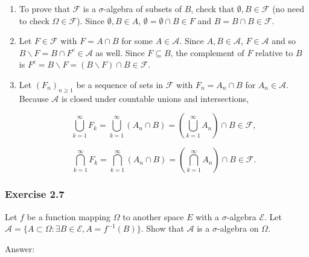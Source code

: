 \documentclass{article}
\begin{document}
\begin{enumerate}
\item To prove that $\mathcal{F}$ is a $\sigma$-algebra of subsets of $B$, check that $\emptyset, B \in \mathcal{F}$ (no need to check $\Omega \in \mathcal{F}$). Since $\emptyset, B \in A$, $\emptyset = \emptyset\cap B \in F$ and $B = B\cap B \in \mathcal{F}$. 

\item Let $F \in \mathcal{F}$ with $F = A\cap B$ for some $A \in \mathcal{A}$. Since $A,B \in \mathcal{A}$, $F \in \mathcal{A}$ and so $B \backslash F = B \cap F^c \in \mathcal{A}$ as well. Since $F \subseteq B$, the complement of $F$ relative to $B$ is $F^c = B \backslash F =  (B\backslash F) \cap B \in \mathcal{F}$.


\item Let $(F_n)_{n\geq 1}$ be a sequence of sets in $\mathcal{F}$ with $F_n = A_n \cap B$ for $A_n \in \mathcal{A}$. Because $\mathcal{A}$ is closed under countable unions and intersections,

$$
\bigcup_{k=1}^\infty F_k = \bigcup_{k=1}^\infty (A_n \cap B) = \left(\bigcup_{k=1}^\infty A_n\right) \cap B \in \mathcal{F},
$$

$$
\bigcap_{k=1}^\infty F_k = \bigcap_{k=1}^\infty (A_n \cap B) = \left(\bigcap_{k=1}^\infty A_n\right) \cap B \in \mathcal{F}.
$$
\end{enumerate}

\subsubsection*{Exercise 2.7}

Let $f$ be a function mapping $\Omega$ to another space $E$ with a $\sigma$-algebra $\mathcal{E}$.
Let $\mathcal{A} = \{A \subset \Omega : \exists B \in \mathcal{E}, A = f^{-1}(B)\}$. Show that $\mathcal{A}$ is a
$\sigma$-algebra on $\Omega$. 

Answer:
\end{document}
